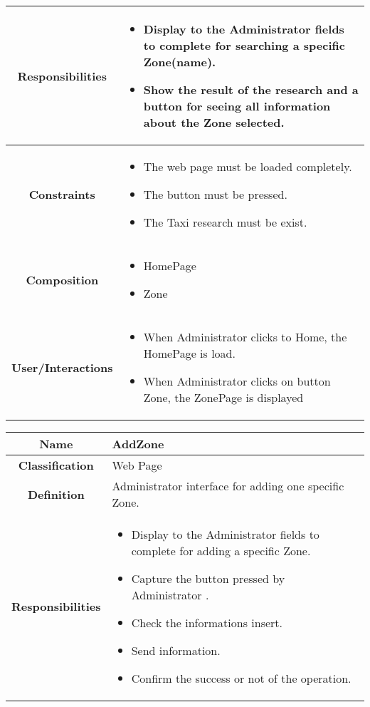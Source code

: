 \documentclass[11pt, a4paper,titlepage]{article}
\begin{document}
\begin{enumerate}
\begin{tabularx}{\textwidth}{| c | X |}
	\hline
	\textbf{Responsibilities} &
	\begin{itemize}
		\item Display to the Administrator fields to complete for searching a specific Zone(name).
		\item Show the result of the research and a button for seeing all information about the Zone selected.
	\end{itemize}
	\\
	\hline
	\textbf{Constraints} &
	\begin{itemize}
		\item  The web page must be loaded completely.
		\item The button must be pressed.
		\item The Taxi research must be exist.
	\end{itemize}
	\\
	\hline
	\textbf{Composition} &
	\begin{itemize}
		\item HomePage
		\item Zone
	\end{itemize}
	\\
	\hline
	\textbf{User/Interactions} &
	\begin{itemize}
		\item When Administrator clicks to Home, the HomePage is load.	
		\item When Administrator clicks on button Zone, the ZonePage is displayed
	\end{itemize}
	\\
	\hline 
\end{tabularx}
\begin{tabularx}{\textwidth}{| c | X |}
	\hline
	\textbf{Name} &
	AddZone
	\\
	\hline
	\textbf{Classification} &
	Web Page
	\\
	\hline
	\textbf{Definition} &
	Administrator interface for adding one specific Zone.\\
	\hline
	\textbf{Responsibilities} &
	\begin{itemize}
		\item Display to the Administrator fields to complete for adding a specific Zone.
		\item Capture the button pressed by Administrator .	
		\item Check the informations insert.
		\item Send information.
		\item Confirm the success or not of the operation.

\end{itemize}
\end{tabularx}
\end{enumerate}
\end{document}
